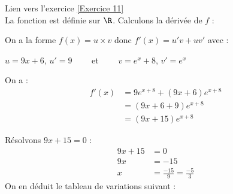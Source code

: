 \documentclass[12pt,fleqn]{report} %
\begin{document}
\begin{correction}Lien vers l'exercice   \ref{Exercice 11}\\
	La fonction est définie sur $\R$. Calculons la dérivée de $f$ :
	
	On a la forme $f(x)=u\times v$ donc $f'(x)=u'v+uv'$ avec :
	\begin{center}
		$u=9x+6$, $u'=9 \qquad$ et $\qquad v=e^x+8$, $v'=e^x$
	\end{center}
	On a :
	\begin{align*}
	f'(x) & =9e^{x+8} + (9x+6)e^{x+8}\\ & =(9x+6+9)e^{x+8}\\ & =(9x+15)e^{x+8}
	\end{align*}
	
	Résolvons $9x+15=0$ : 
	\begin{align*}
	9x+15& =0 \\ 9x & =-15 \\ x & =\frac{-15}{9}= \frac{-5}{3}
	\end{align*}
	On en déduit le tableau de variations suivant : 
	\begin{center}
	\end{center}
\end{correction}
\end{document}
